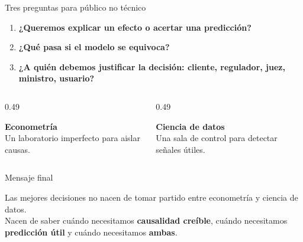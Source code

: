 \documentclass[aspectratio=169,11pt,table]{beamer}
\begin{document}
\begin{frame}{Tres preguntas para público no técnico}
\begin{enumerate}
  \item \textbf{¿Queremos explicar un efecto o acertar una predicción?}
  \item \textbf{¿Qué pasa si el modelo se equivoca?}
  \item \textbf{¿A quién debemos justificar la decisión: cliente, regulador, juez, ministro, usuario?}
\end{enumerate}

\vspace{0.45cm}
\begin{columns}[T,onlytextwidth]
\begin{column}{0.49\textwidth}
\begin{ccdebox}
\centering
\textbf{Econometría}\\
Un laboratorio imperfecto para aislar causas.
\end{ccdebox}
\end{column}
\begin{column}{0.49\textwidth}
\begin{ccdebox}
\centering
\textbf{Ciencia de datos}\\
Una sala de control para detectar señales útiles.
\end{ccdebox}
\end{column}
\end{columns}

\end{frame}

\begin{frame}{Mensaje final}
\begin{center}
\begin{keybox}[width=0.86\textwidth]
\centering
\Large
Las mejores decisiones no nacen de tomar partido entre econometría y ciencia de datos.\\[0.35em]
Nacen de saber cuándo necesitamos \textbf{causalidad creíble}, cuándo necesitamos \textbf{predicción útil} y cuándo necesitamos \textbf{ambas}.
\end{keybox}

\vspace{0.55cm}
 \hspace{0.2cm}
 \hspace{0.2cm}
 \hspace{0.2cm}
 \hspace{0.2cm}
\end{center}

\end{frame}
\end{document}
